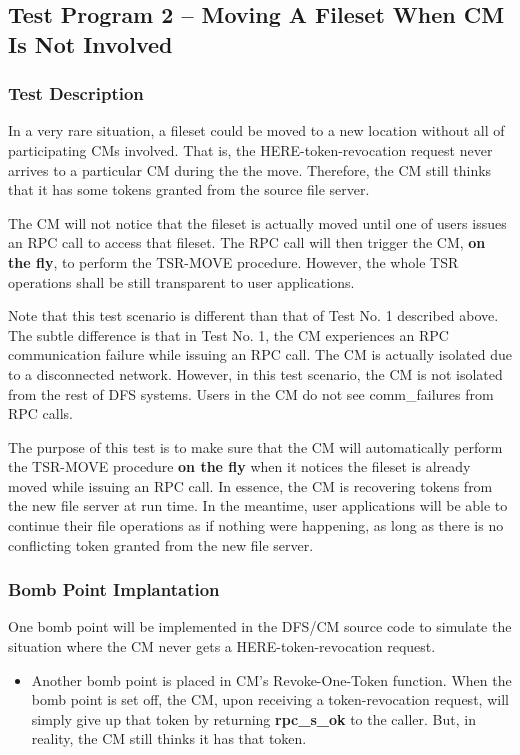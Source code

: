 \pagebreak 
\subsection {Test Program 2 -- Moving A Fileset When CM Is Not Involved}

\subsubsection {Test Description}

In a very rare situation, a fileset could be moved to a new location 
without all of participating CMs involved. That is, the 
HERE-token-revocation request never arrives to a particular CM during the 
the move. Therefore, the CM still thinks that it has some tokens granted
from the source file server. 

The CM will not notice that the fileset is actually moved until
one of users issues an RPC call to access that fileset. The RPC call
will then trigger the CM, {\bf on the fly}, to perform the 
TSR-MOVE procedure. 
However, the whole TSR operations shall be still transparent to user 
applications. 

Note that this test scenario is different than that of Test No. 1 
described above. 
The subtle difference is that in Test No. 1, the CM experiences an RPC
communication failure while issuing an RPC call. The CM is 
actually isolated due to a disconnected network. 
However, in this test scenario, the CM is not isolated from the rest of 
DFS systems. Users in the CM do not see comm_failures from RPC calls. 

The purpose of this test is to make sure that the CM will automatically 
perform the TSR-MOVE procedure {\bf on the fly} when it notices the fileset 
is already moved while issuing an RPC call. In essence, the CM is recovering
tokens from the new file server at run time. In the meantime, user 
applications  will be able to continue their file operations as if nothing 
were happening, as long as there is no conflicting token granted from the new
file server.
 

\subsubsection {Bomb Point Implantation}

One bomb point will be implemented in the DFS/CM source code to simulate
the situation where the CM never gets a HERE-token-revocation request.
\begin{itemize}
\item Another bomb point is placed in CM's Revoke-One-Token function.
When the bomb point is set off, the CM, upon receiving a token-revocation
request, will simply give up that token by returning {\bf rpc_s_ok} to the 
caller. But, in reality, the CM still thinks it has that token.
\end{itemize}

